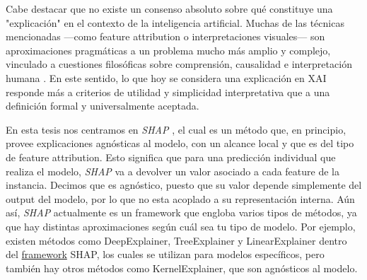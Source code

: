 \begin{itemize}
    Cabe destacar que no existe un consenso absoluto sobre qué constituye una "explicación" en el contexto de la inteligencia artificial. Muchas de las técnicas mencionadas —como feature attribution o interpretaciones visuales— son aproximaciones pragmáticas a un problema mucho más amplio y complejo, vinculado a cuestiones filosóficas sobre comprensión, causalidad e interpretación humana \cite{MILLER20191, lipton2017mythosmodelinterpretability}. En este sentido, lo que hoy se considera una explicación en XAI responde más a criterios de utilidad y simplicidad interpretativa que a una definición formal y universalmente aceptada.

\end{itemize}

En esta tesis nos centramos en \textit{SHAP} \cite{shapOriginalPaper}, el cual es un método que, en principio, provee explicaciones agnósticas al modelo, con un alcance local y que es del tipo de feature attribution. Esto significa que para una predicción individual que realiza el modelo, \textit{SHAP} va a devolver un valor asociado a cada feature de la instancia. Decimos que es agnóstico, puesto que su valor depende simplemente del output del modelo, por lo que no esta acoplado a su representación interna. Aún así, \textit{SHAP} actualmente es un framework que engloba varios tipos de métodos, ya que hay distintas aproximaciones según cuál sea tu tipo de modelo. Por ejemplo, existen métodos como DeepExplainer, TreeExplainer y LinearExplainer dentro del  \textcolor{blue}{\href{https://shap.readthedocs.io/en/latest/index.html}{framework}}  SHAP, los cuales se utilizan para modelos específicos, pero también hay otros métodos como KernelExplainer, que son agnósticos al modelo.


